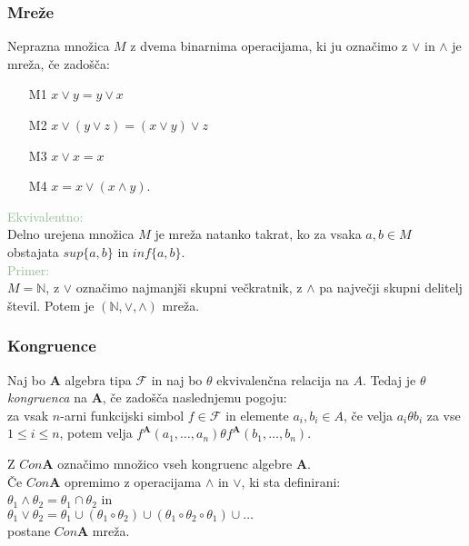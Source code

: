 \documentclass{beamer}
\begin{document}
\begin{frame}
\frametitle{Mreže}
    
    Neprazna množica $M$ z dvema binarnima operacijama, ki ju označimo z $\vee$ in $\wedge$ je mreža, če zadošča:\\
    \begin{enumerate} 
        \item[M1] $x \vee y = y \vee x$
        \item[M2] $x\vee \left(y \vee z\right) = \left(x \vee y\right)\vee z$
        \item[M3] $x \vee x = x$
        \item[M4] $x = x \vee \left(x \wedge y\right)$. \\
    \end{enumerate}
    \pause
    \textcolor{darkseagreen}{Ekvivalentno:} \\
        Delno urejena množica $M$ je mreža natanko takrat, ko za vsaka $a, b \in M$ obstajata $sup\{a, b\}$ 
        in $inf\{a, b\}$.\\
        \textcolor{darkseagreen}{Primer:}\\
    $M = \mathbb{N}$, z $\vee$ označimo najmanjši skupni večkratnik, z $\wedge$ pa največji skupni delitelj
    števil. Potem je $\left(\mathbb{N}, \vee, \wedge\right)$ mreža. 
    
\end{frame}
\begin{frame}
\frametitle{Kongruence}
\begin{block}
Naj bo $\mathbf{A}$ algebra tipa $\mathcal{F}$ in naj bo $\theta$ ekvivalenčna relacija na $A$. Tedaj je $\theta$ \emph{kongruenca} 
na $\mathbf{A}$, če zadošča naslednjemu pogoju: \\
za vsak $n$-arni funkcijski simbol $f \in \mathcal{F}$ in elemente $a_i, b_i \in A$, če velja $a_i\theta b_i$ 
za vse $1 \leq i \leq n$, potem velja $f^\mathbf{A}\left(a_1, \dots, a_n\right) \theta 
f^\mathbf{A}\left(b_1, \dots, b_n\right)$.\\
\end{block}

Z $Con \mathbf{A}$ označimo množico vseh kongruenc algebre $\mathbf{A}$.
\\
\pause
Če $Con \mathbf{A}$ opremimo z operacijama $\wedge$ in $\vee$, ki sta definirani:\\
$\theta_1 \wedge \theta_2 = \theta_1 \cap \theta_2$ in \\ 
$\theta_1 \vee \theta_2 = \theta_1 \cup \left(\theta_1 \circ \theta_2\right)
\cup \left(\theta_1 \circ \theta_2 \circ \theta_1\right) \cup \dots$ \\
postane $Con \mathbf{A}$ mreža.
\end{frame}
\end{document}

